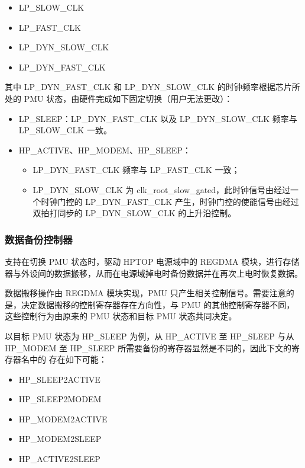 \documentclass[main\_\_CN.tex]{subfiles}
\begin{document}
    \begin{itemize}
    \item LP\_SLOW\_CLK
    \item LP\_FAST\_CLK
    \item LP\_DYN\_SLOW\_CLK
    \item LP\_DYN\_FAST\_CLK
    \end{itemize}

其中 LP\_DYN\_FAST\_CLK 和 LP\_DYN\_SLOW\_CLK 的时钟频率根据芯片所处的 PMU 状态，由硬件完成如下固定切换（用户无法更改）：

    \begin{itemize}
    \item LP\_SLEEP：LP\_DYN\_FAST\_CLK 以及 LP\_DYN\_SLOW\_CLK 频率与 LP\_SLOW\_CLK 一致。
    \item HP\_ACTIVE、HP\_MODEM、HP\_SLEEP：
    \begin{itemize}
        \item LP\_DYN\_FAST\_CLK 频率与 LP\_FAST\_CLK 一致；
        \item LP\_DYN\_SLOW\_CLK 为 clk\_root\_slow\_gated，此时钟信号由经过一个时钟门控的 LP\_DYN\_FAST\_CLK 产生，时钟门控的使能信号由经过双拍打同步的 LP\_DYN\_SLOW\_CLK 的上升沿控制。
    \end{itemize}
    \end{itemize}

\subsubsection{数据备份控制器}

\chipname{} 支持在切换 PMU 状态时，驱动 HPTOP 电源域中的 REGDMA 模块，进行存储器与外设间的数据搬移，从而在电源域掉电时备份数据并在再次上电时恢复数据。

数据搬移操作由 REGDMA 模块实现，PMU 只产生相关控制信号。需要注意的是，决定数据搬移的控制寄存器存在方向性，与 PMU 的其他控制寄存器不同，这些控制行为由原来的 PMU 状态和目标 PMU 状态共同决定。

以目标 PMU 状态为 HP\_SLEEP 为例，从 HP\_ACTIVE 至 HP\_SLEEP 与从 HP\_MODEM 至 HP\_SLEEP 所需要备份的寄存器显然是不同的，因此下文的寄存器名中的  存在如下可能：

\begin{itemize}
    \item HP\_SLEEP2ACTIVE
    \item HP\_SLEEP2MODEM
    \item HP\_MODEM2ACTIVE
    \item HP\_MODEM2SLEEP
    \item HP\_ACTIVE2SLEEP
\end{itemize}
\end{document}
